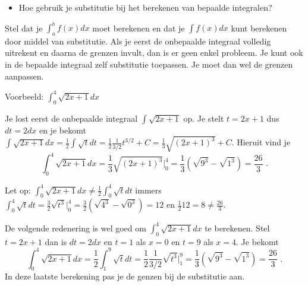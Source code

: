\documentclass{article}
\begin{document}
\begin{itemize}
\item Hoe gebruik je substitutie bij het berekenen van bepaalde integralen?
\end{itemize}

Stel dat je $\int ^b_a f(x)dx$ moet berekenen en dat je $\int f(x)dx$ kunt berekenen door middel van substitutie.
Als je eerst de onbepaalde integraal volledig uitrekent en daarna de grenzen invult, dan is er geen enkel probleem.
Je kunt ook in de bepaalde integraal zelf substitutie toepassen.
Je moet dan wel de grenzen aanpassen.

Voorbeeld:
$\int ^4_0 \sqrt{2x+1}dx$

Je lost eerst de onbepaalde integraal $\int \sqrt{2x+1}$ op.
Je stelt $t=2x+1$ dus $dt=2dx$ en je bekomt $\int \sqrt {2x+1} dx=\frac{1}{2} \int \sqrt {t} dt=\frac {1}{2} \frac{1}{3/2} t^{3/2}+C=\frac{1}{3} \sqrt {(2x+1)^3}+C$.
Hieruit vind je
\[
\int ^4_0 \sqrt {2x+1} dx=\frac{1}{3} \sqrt {(2x+1)^3}\vert ^4_0=\frac{1}{3}\left( \sqrt{9^3} - \sqrt{1^3} \right)=\frac{26}{3} \text { .}
\]

Let op: $\int ^4_0 \sqrt {2x+1}dx \neq \frac{1}{2} \int ^4_0 \sqrt {t} dt$ immers $\int ^4_0 \sqrt {t} dt=\frac{3}{2}\sqrt {t^3}\vert ^4_0=\frac{3}{2}\left( \sqrt {4^3}-\sqrt {0^3} \right)=12$ en $\frac{1}{2}12=8\neq \frac{26}{3}$.

De volgende redenering is wel goed om $\int ^4_0 \sqrt {2x+1}dx$ te berekenen.
Stel $t=2x+1$ dan is $dt=2dx$ en $t=1$ als $x=0$ en $t=9$ als $x=4$.
Je bekomt
\[
\int ^4_0 \sqrt{2x+1}dx = \frac{1}{2} \int ^9_1 \sqrt {t} dt= \frac{1}{2} \frac{1}{3/2} \sqrt {t^3} \vert^9_1=\frac{1}{3} \left( \sqrt{9^3}-\sqrt{1^3} \right)=\frac{26}{3} \text { .}
\]
In deze laatste berekening pas je de genzen bij de substitutie aan.
\end{document}
